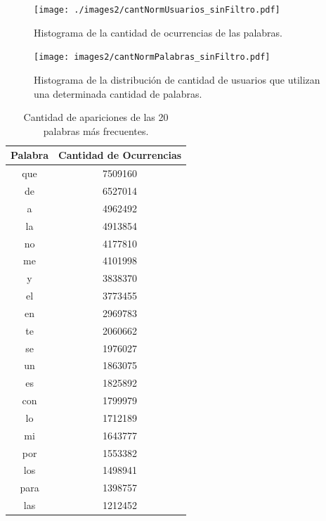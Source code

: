 
\begin{figure}[!ht]\centering
  \begin{minipage}[t]{0.49\textwidth}
    \texttt{[image: ./images2/cantNormUsuarios\_sinFiltro.pdf]}
    \caption{Histograma de la cantidad de ocurrencias de las palabras.} 
    \label{fig:cantNormUsuarios} 
   \end{minipage}
   \begin{minipage}[t]{0.49\textwidth}
    \texttt{[image: images2/cantNormPalabras\_sinFiltro.pdf]}
    \caption{Histograma de la distribución de cantidad de usuarios que utilizan una determinada cantidad de palabras.} 
    \label{fig:cantNormPalabras} 
   \end{minipage}
   
\end{figure}


\begin{table}[ht]
\centering
\label{tab:palabrasMasOcurrentes}
\begin{tabular}{ c c }
\toprule
Palabra & Cantidad de Ocurrencias \\ 
\midrule
que     & 7509160                 \\
de      & 6527014                 \\
a       & 4962492                 \\
la      & 4913854                 \\
no      & 4177810                 \\
me      & 4101998                 \\
y       & 3838370                 \\
el      & 3773455                 \\
en      & 2969783                 \\
te      & 2060662                 \\
se      & 1976027                 \\
un      & 1863075                 \\
es      & 1825892                 \\
con     & 1799979                 \\
lo      & 1712189                 \\
mi      & 1643777                 \\
por     & 1553382                 \\
los     & 1498941                 \\
para    & 1398757                 \\
las     & 1212452                 \\
\bottomrule
\end{tabular}
\caption{Cantidad de apariciones de las 20 palabras más frecuentes.}

\end{table}

